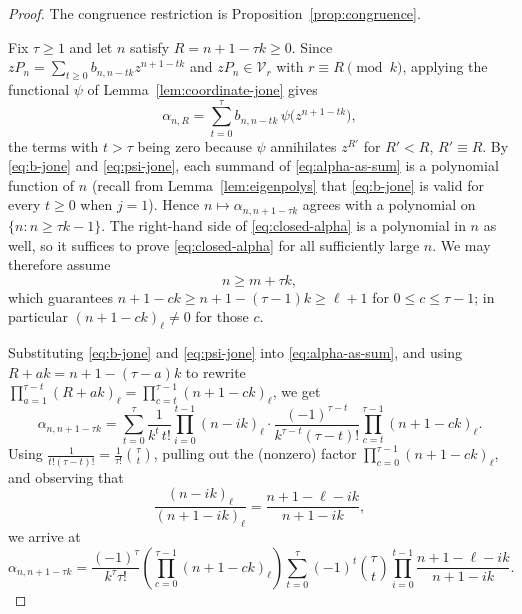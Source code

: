 \documentclass{amsart}
\theoremstyle{definition}
\newcommand{\fall}[2]{(#1)_{#2}}
\begin{document}
\begin{proof}
The congruence restriction is Proposition~\ref{prop:congruence}.

Fix \(\tau\ge1\) and let \(n\) satisfy \(R=n+1-\tau k\ge0\).  Since
\(zP_n=\sum_{t\ge0}b_{n,n-tk}z^{n+1-tk}\) and \(zP_n\in\mathcal V_r\) with
\(r\equiv R \pmod k\), applying the functional \(\psi\) of
Lemma~\ref{lem:coordinate-jone} gives
\begin{equation}\label{eq:alpha-as-sum}
\alpha_{n,R}
=\sum_{t=0}^{\tau}b_{n,n-tk}\,\psi\bigl(z^{n+1-tk}\bigr),
\end{equation}
the terms with \(t>\tau\) being zero because \(\psi\) annihilates
\(z^{R'}\) for \(R'<R\), \(R'\equiv R\).  By \eqref{eq:b-jone} and
\eqref{eq:psi-jone}, each summand of \eqref{eq:alpha-as-sum} is a polynomial
function of \(n\) (recall from Lemma~\ref{lem:eigenpolys} that
\eqref{eq:b-jone} is valid for every \(t\ge0\) when \(j=1\)).  Hence
\(n\mapsto\alpha_{n,n+1-\tau k}\) agrees with a polynomial on
\(\{n:n\ge\tau k-1\}\).  The right-hand side of \eqref{eq:closed-alpha} is a
polynomial in \(n\) as well, so it suffices to prove
\eqref{eq:closed-alpha} for all sufficiently large \(n\).  We may therefore
assume
\begin{equation}\label{eq:n-large}
n\ge m+\tau k,
\end{equation}
which guarantees \(n+1-ck\ge n+1-(\tau-1)k\ge\ell+1\) for \(0\le c\le\tau-1\);
in particular \(\fall{n+1-ck}{\ell}\ne0\) for those \(c\).

Substituting \eqref{eq:b-jone} and \eqref{eq:psi-jone} into
\eqref{eq:alpha-as-sum}, and using \(R+ak=n+1-(\tau-a)k\) to rewrite
\(\prod_{a=1}^{\tau-t}\fall{R+ak}{\ell}=\prod_{c=t}^{\tau-1}\fall{n+1-ck}{\ell}\),
we get
\[
\alpha_{n,n+1-\tau k}
=\sum_{t=0}^{\tau}
\frac{1}{k^t\,t!}\prod_{i=0}^{t-1}\fall{n-ik}{\ell}
\cdot
\frac{(-1)^{\tau-t}}{k^{\tau-t}(\tau-t)!}
\prod_{c=t}^{\tau-1}\fall{n+1-ck}{\ell}.
\]
Using \(\frac{1}{t!(\tau-t)!}=\frac{1}{\tau!}\binom{\tau}{t}\), pulling out
the (nonzero) factor \(\prod_{c=0}^{\tau-1}\fall{n+1-ck}{\ell}\), and
observing that
\[
\frac{\fall{n-ik}{\ell}}{\fall{n+1-ik}{\ell}}
=\frac{n+1-\ell-ik}{n+1-ik},
\]
we arrive at
\begin{equation}\label{eq:pre-vandermonde}
\alpha_{n,n+1-\tau k}
=
\frac{(-1)^\tau}{k^\tau\tau!}
\left(\prod_{c=0}^{\tau-1}\fall{n+1-ck}{\ell}\right)
\sum_{t=0}^{\tau}(-1)^t\binom{\tau}{t}
\prod_{i=0}^{t-1}\frac{n+1-\ell-ik}{n+1-ik}.
\end{equation}


\end{proof}
\end{document}
